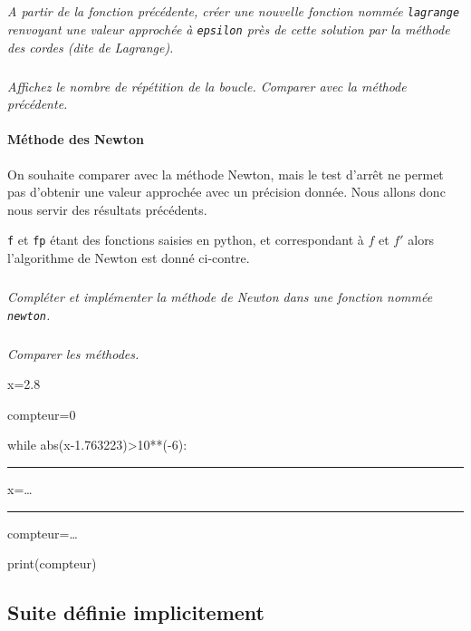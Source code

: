 \documentclass[10pt,oneside]{article}
\begin{document}
\subparagraph{} \textit{A partir de la fonction précédente, créer une nouvelle fonction nommée \texttt{lagrange} renvoyant une valeur approchée à \texttt{epsilon} près de cette solution par la méthode des cordes (dite de Lagrange).}

\subparagraph{} \textit{Affichez le nombre de répétition de la boucle. Comparer avec la méthode précédente.}




\paragraph*{Méthode des Newton}
\vspace{.25cm}

\begin{minipage}[c]{.47\linewidth}

On souhaite comparer avec la méthode Newton, mais le test d'arrêt ne permet pas d'obtenir une valeur approchée avec un précision donnée. Nous allons donc nous servir des résultats précédents.

\texttt{f} et \texttt{fp} étant des fonctions saisies en python, et correspondant à $f$ et $f'$ alors l'algorithme de Newton est donné ci-contre.


\subparagraph{} \textit{Compléter et implémenter la méthode de Newton dans une fonction nommée \texttt{newton}. }

\subparagraph{} \textit{Comparer les méthodes. }

\end{minipage} \hfill
\begin{minipage}[c]{.47\linewidth}
\begin{py}
\ttfamily
x=2.8

compteur=0 

while abs(x-1.763223)>10**(-6):

\rule{4ex}{0pt} x=\ldots

\rule{4ex}{0pt} compteur=\ldots

print(compteur)

\end{py}
\end{minipage} 


\setcounter{subparagraph}{0}



\subsection*{Suite définie implicitement}
\end{document}
